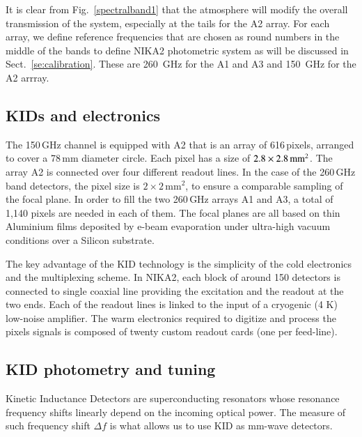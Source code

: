 It is clear from Fig.~\ref{spectralband1} that the atmosphere will
modify the overall transmission of the system, especially at the tails
for the A2 array.
For each array, we define reference frequencies that are chosen
as round numbers in the middle of the bands to define NIKA2
photometric system as will be discussed in
Sect.~\ref{se:calibration}. These are 260~GHz for the A1 and A3 and
150~GHz for the A2 arrray.

\subsection{KIDs and electronics}
\label{se:array}

The 150\,GHz channel is equipped with A2 that is an array of
616\,pixels, arranged to cover a 78\,mm diameter circle. Each pixel has a size of
$2.8\times2.8\textrm{\,mm}^2$. The array A2 is connected over four different
readout lines. In the case of the 260\,GHz band detectors, the pixel size is
$2\times 2\mathrm{\,mm}^2$, to ensure a comparable sampling of the focal
plane. In order to fill the two 260\,GHz arrays A1 and A3, a total of 1,140 pixels are
needed in each of them. The focal planes are all based on thin Aluminium films
deposited by e-beam evaporation under ultra-high vacuum conditions over a
Silicon substrate.

The key advantage of the KID technology is the simplicity of the cold
electronics and the multiplexing scheme. In NIKA2, each block of around 150
detectors is connected to single coaxial line providing the excitation and the
readout at the two ends. Each of the readout lines is linked to the input of a
cryogenic (4 K) low-noise amplifier. The warm electronics required to digitize
and process the pixels signals is composed of twenty custom readout cards (one
per feed-line).



\subsection{KID photometry and tuning}
\label{se:tuning}

Kinetic Inductance Detectors are superconducting resonators whose resonance
frequency shifts linearly depend on the incoming optical power. The
measure of such frequency shift $\Delta f$ is what allows us to use
KID as mm-wave detectors.

